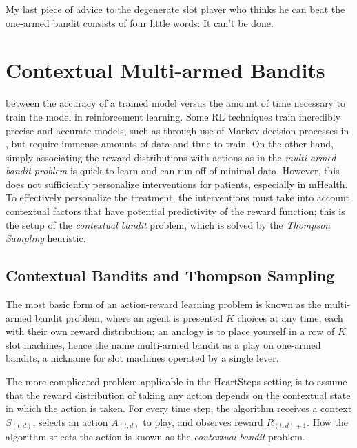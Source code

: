 \begin{savequote}[75mm]
My last piece of advice to the degenerate slot player who thinks he can beat the one-armed bandit consists of four little words: It can't be done.
\end{savequote}

\chapter{Contextual Multi-armed Bandits}

 between the accuracy of a trained model versus the amount of time necessary to train the model in reinforcement learning.  Some RL techniques train incredibly precise and accurate models, such as through use of Markov decision processes in \citet{Sutton1998}, but require immense amounts of data and time to train.   On the other hand, simply associating the reward distributions with actions as in the {\it multi-armed bandit problem} is quick to learn and can run off of minimal data.  However, this does not sufficiently personalize interventions for patients, especially in mHealth. To effectively personalize the treatment, the interventions must take into account contextual factors that have potential predictivity of the reward function; this is the setup of the {\it contextual bandit} problem, which is solved by the {\it Thompson Sampling} heuristic.

\section{Contextual Bandits and Thompson Sampling}

The most basic form of an action-reward learning problem is known as the multi-armed bandit problem, where an agent is presented $K$ choices at any time, each with their own reward distribution; an analogy is to place yourself in a row of $K$ slot machines, hence the name multi-armed bandit as a play on one-armed bandits, a nickname for slot machines operated by a single lever.

The more complicated problem applicable in the HeartSteps setting is to assume that the reward distribution of taking any action depends on the contextual state in which the action is taken.  For every time step, the algorithm receives a context $S_{(t,d)}$, selects an action $A_{(t,d)}$ to play, and observes reward $R_{(t,d)+1}$.  How the algorithm selects the action is known as the {\it contextual bandit} problem. 

